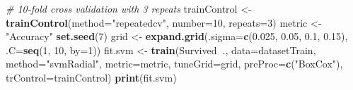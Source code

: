 \documentclass[]{article}
\newenvironment{Shaded}{\begin{snugshade}}{\end{snugshade}}
\newcommand{\KeywordTok}[1]{\textcolor[rgb]{0.13,0.29,0.53}{\textbf{#1}}}
\newcommand{\DataTypeTok}[1]{\textcolor[rgb]{0.13,0.29,0.53}{#1}}
\newcommand{\DecValTok}[1]{\textcolor[rgb]{0.00,0.00,0.81}{#1}}
\newcommand{\FloatTok}[1]{\textcolor[rgb]{0.00,0.00,0.81}{#1}}
\newcommand{\StringTok}[1]{\textcolor[rgb]{0.31,0.60,0.02}{#1}}
\newcommand{\CommentTok}[1]{\textcolor[rgb]{0.56,0.35,0.01}{\textit{#1}}}
\newcommand{\OperatorTok}[1]{\textcolor[rgb]{0.81,0.36,0.00}{\textbf{#1}}}
\newcommand{\NormalTok}[1]{#1}
\begin{document}
\begin{Shaded}
\begin{Highlighting}[]
\CommentTok{# 10-fold cross validation with 3 repeats}
\NormalTok{trainControl <-}\StringTok{ }\KeywordTok{trainControl}\NormalTok{(}\DataTypeTok{method=}\StringTok{"repeatedcv"}\NormalTok{, }\DataTypeTok{number=}\DecValTok{10}\NormalTok{, }\DataTypeTok{repeats=}\DecValTok{3}\NormalTok{)}
\NormalTok{metric <-}\StringTok{ "Accuracy"}
\KeywordTok{set.seed}\NormalTok{(}\DecValTok{7}\NormalTok{)}
\NormalTok{grid <-}\StringTok{ }\KeywordTok{expand.grid}\NormalTok{(}\DataTypeTok{.sigma=}\KeywordTok{c}\NormalTok{(}\FloatTok{0.025}\NormalTok{, }\FloatTok{0.05}\NormalTok{, }\FloatTok{0.1}\NormalTok{, }\FloatTok{0.15}\NormalTok{), }\DataTypeTok{.C=}\KeywordTok{seq}\NormalTok{(}\DecValTok{1}\NormalTok{, }\DecValTok{10}\NormalTok{, }\DataTypeTok{by=}\DecValTok{1}\NormalTok{))}
\NormalTok{fit.svm <-}\StringTok{ }\KeywordTok{train}\NormalTok{(Survived}\OperatorTok{~}\NormalTok{., }\DataTypeTok{data=}\NormalTok{datasetTrain, }\DataTypeTok{method=}\StringTok{"svmRadial"}\NormalTok{, }\DataTypeTok{metric=}\NormalTok{metric, }\DataTypeTok{tuneGrid=}\NormalTok{grid,}
    \DataTypeTok{preProc=}\KeywordTok{c}\NormalTok{(}\StringTok{"BoxCox"}\NormalTok{), }\DataTypeTok{trControl=}\NormalTok{trainControl)}
\KeywordTok{print}\NormalTok{(fit.svm)}
\end{Highlighting}
\end{Shaded}
\end{document}
